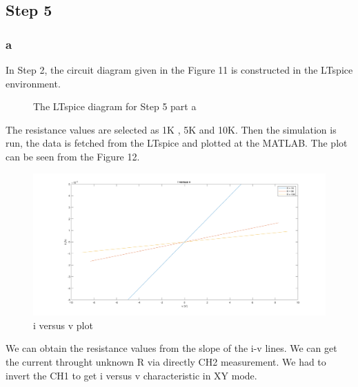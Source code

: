 \documentclass[letterpaper,12pt]{article}
\begin{document}
\subsection{Step 5}
\subsubsection{a}
In Step 2, the circuit diagram given in the Figure 11 is constructed in the LTspice environment.
\begin{figure}[H] 
	\caption{The LTspice diagram for Step 5 part a }
\end{figure}
The resistance values are selected as 1K , 5K and 10K. Then the simulation is run, the data is fetched from the LTspice and plotted at the MATLAB. The plot can be seen from the Figure 12.

\begin{figure}[H]
	\centering
   \includegraphics[width=1\textwidth]{5a.png}
   \caption{i versus v plot}
\end{figure}  
We can obtain the resistance values from the slope of the i-v lines. We can get the  current throught unknown R via directly CH2 measurement. We had to invert the CH1 to get i versus v characteristic in XY mode.
\end{document}
